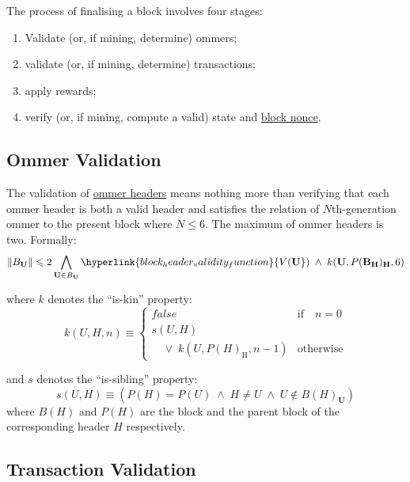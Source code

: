 \documentclass[9pt,oneside]{amsart}
\begin{document}
\begin{multicols}{2}
The process of finalising a block involves four stages:

\begin{enumerate}
\item Validate (or, if mining, determine) ommers;
\item validate (or, if mining, determine) transactions;
\item apply rewards;
\item verify (or, if mining, compute a valid) state and \hyperlink{block_nonce}{block nonce}.
\end{enumerate}

\subsection{Ommer Validation}

The validation of \hyperlink{ommer_block_headers_B__U}{ommer headers} means nothing more than verifying that each ommer header is both a valid header and satisfies the relation of $N$th-generation ommer to the present block where $N \leq 6$. The maximum of ommer headers is two. Formally:
\begin{equation}
\lVert B_{\mathbf{U}} \rVert \leqslant 2 \bigwedge_{\mathbf{U} \in B_{\mathbf{U}}} \hyperlink{block_header_validity_function}{V({\mathbf{U}}})\; \wedge \; k({\mathbf{U}}, P(\mathbf{B}_{\mathbf{H}})_{\mathbf{H}}, 6)
\end{equation}

where $k$ denotes the ``is-kin'' property:
\begin{equation}
k(U, H, n) \equiv \begin{cases} \mathit{false} & \text{if} \quad n = 0 \\
s(U, H) &\\
\quad \vee \; k(U, P(H)_{\mathrm{H}}, n - 1) & \text{otherwise}
\end{cases}
\end{equation}

and $s$ denotes the ``is-sibling'' property:
\begin{equation}
s(U, H) \equiv (P(H) = P(U)\; \wedge \; H \neq U \; \wedge \; U \notin B(H)_{\mathbf{U}})
\end{equation}
where $B(H)$ and $P(H)$ are the block and the parent block of the corresponding header $H$ respectively.

\subsection{Transaction Validation}


\end{multicols}
\end{document}
